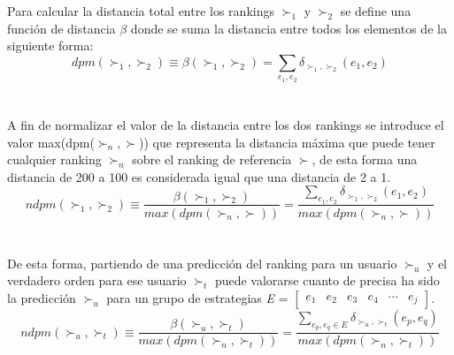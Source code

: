 \\ \\
Para calcular la distancia total entre los rankings $\succ_1$ y $\succ_2$ se define una función de distancia $\beta$ donde se suma la distancia entre todos los elementos de la siguiente forma:
\[  
        dpm(\succ_1, \succ_2) \equiv \beta(\succ_1, \succ_2) = \sum\limits_{e_1, e_2} \delta_{\succ_1, \succ_2}(e_1, e_2)
\]
\\ \\
A fin de normalizar el valor de la distancia entre los dos rankings se introduce el valor max(dpm($\succ_n, \succ$)) que representa la distancia máxima que puede tener cualquier ranking $\succ_n$ sobre el ranking de referencia $\succ$, de esta forma una distancia de 200 a 100 es considerada igual que una distancia de 2 a 1.
\[  
        ndpm(\succ_1, \succ_2) \equiv \frac{\beta(\succ_1, \succ_2)}{max(dpm(\succ_n, \succ))} = \frac{\sum\limits_{e_1, e_2} \delta_{\succ_1, \succ_2}(e_1, e_2)}{max(dpm(\succ_n, \succ))}
\]
\\ \\
De esta forma, partiendo de una predicción del ranking para un usuario $\succ_u$ y el verdadero orden para ese usuario $\succ_t$ puede valorarse cuanto de precisa ha sido la predicción $\succ_u$ para un grupo de estrategias \textit{E} = $\begin{bmatrix} \textit{e$_{1}$} & \textit{e$_{2}$} & \textit{e$_{3}$} & \textit{e$_{4}$} & \cdots & \textit{e$_{j}$} \end{bmatrix}$.
\[  
        ndpm(\succ_u, \succ_t) \equiv \frac{\beta(\succ_u, \succ_t)}{max(dpm(\succ_n, \succ_t))} = \frac{\sum\limits_{e_p, e_q \in E} \delta_{\succ_u, \succ_t}(e_p, e_q)}{max(dpm(\succ_n, \succ_t))}
\]